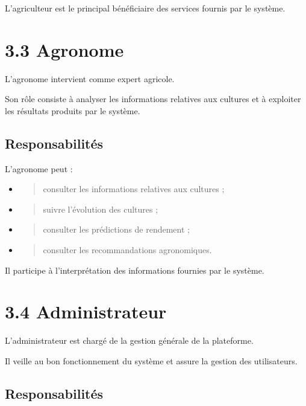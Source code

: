 \documentclass[
]{book}
\begin{document}
L'agriculteur est le principal bénéficiaire des services fournis par le
système.

\hypertarget{agronome}{%
\section{3.3 Agronome}\label{agronome}}

L'agronome intervient comme expert agricole.

Son rôle consiste à analyser les informations relatives aux cultures et
à exploiter les résultats produits par le système.

\hypertarget{responsabilituxe9s-1}{%
\subsection{Responsabilités}\label{responsabilituxe9s-1}}

L'agronome peut :

\begin{itemize}
\item
  \begin{quote}
  consulter les informations relatives aux cultures ;
  \end{quote}
\item
  \begin{quote}
  suivre l'évolution des cultures ;
  \end{quote}
\item
  \begin{quote}
  consulter les prédictions de rendement ;
  \end{quote}
\item
  \begin{quote}
  consulter les recommandations agronomiques.
  \end{quote}
\end{itemize}

Il participe à l'interprétation des informations fournies par le
système.

\hypertarget{administrateur}{%
\section{3.4 Administrateur}\label{administrateur}}

L'administrateur est chargé de la gestion générale de la plateforme.

Il veille au bon fonctionnement du système et assure la gestion des
utilisateurs.

\hypertarget{responsabilituxe9s-2}{%
\subsection{Responsabilités}\label{responsabilituxe9s-2}}
\end{document}
